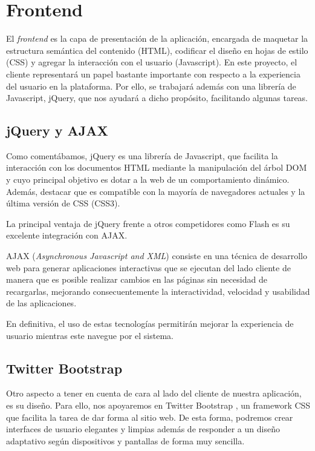 \section{Frontend}
El \textit{frontend} es la capa de presentación de la aplicación, encargada de maquetar la estructura semántica del contenido (HTML), codificar el diseño en hojas de estilo (CSS) y agregar la interacción con el usuario (Javascript). En este proyecto, el cliente representará un papel bastante importante con respecto a la experiencia del usuario en la plataforma. Por ello, se trabajará además con una librería de Javascript, jQuery, que nos ayudará a dicho propósito, facilitando algunas tareas. 

\subsection{jQuery y AJAX}
Como comentábamos, jQuery \cite{jQuery} es una librería de Javascript, que facilita la interacción con los documentos HTML mediante la manipulación del árbol DOM y cuyo principal objetivo es dotar a la web de un comportamiento dinámico. Además, destacar que es compatible con la mayoría de navegadores actuales y la última versión de CSS (CSS3).

La principal ventaja de jQuery frente a otros competidores como Flash es su excelente integración con AJAX.

AJAX (\textit{Asynchronous Javascript and XML}) \cite{AJAX} consiste en una técnica de desarrollo web para generar aplicaciones interactivas que se ejecutan del lado cliente de manera que es posible realizar cambios en las páginas sin necesidad de recargarlas, mejorando consecuentemente la interactividad, velocidad y usabilidad de las aplicaciones.

En definitiva, el uso de estas tecnologías permitirán mejorar la experiencia de usuario mientras este navegue por el sistema.

\subsection{Twitter Bootstrap}
Otro aspecto a tener en cuenta de cara al lado del cliente de nuestra aplicación, es su diseño. Para ello, nos apoyaremos en Twitter Bootstrap \cite{Bootstrap}, un framework CSS que facilita la tarea de dar forma al sitio web. De esta forma, podremos crear interfaces de usuario elegantes y limpias además de responder a un diseño adaptativo según dispositivos y pantallas de forma muy sencilla.

